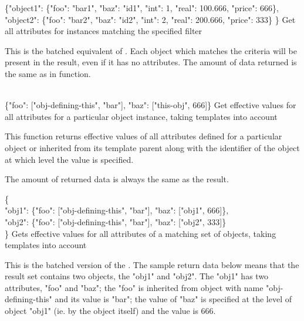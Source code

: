 \documentclass{article}
\begin{document}
    {\{"object1": \{"foo": "bar1", "baz": "id1", "int": 1, "real": 100.666, "price": 666\}, \\
       "object2": \{"foo": "bar2", "baz": "id2", "int": 2, "real": 200.666, "price": 333\}
      \}}
    {Get all attributes for instances matching the specified filter}
    {This is the batched equivalent of .  Each object which matches the criteria will
    be present in the result, even if it has no attributes.  The amount of data returned is the same as in
     function.

    \deskaUnsortedRes}

    {\\ \{"foo": ["obj-defining-this", "bar"], "baz": ["this-obj", 666]\}}
    {Get effective values for all attributes for a particular object instance, taking templates into account}
    {This function returns effective values of all attributes defined for a particular object or inherited from its
    template parent along with the identifier of the object at which level the value is specified.

    The amount of returned data is always the same as the  result.  \deskaUnsortedRes}

    { \{ \\
        "obj1": \{"foo": ["obj-defining-this", "bar"], "baz": ["obj1", 666]\}, \\ 
        "obj2": \{"foo": ["obj-defining-this", "bar"], "baz": ["obj2", 333]\} \\ 
      \} }
    {Gets effective values for all attributes of a matching set of objects, taking templates into account}
    {This is the batched version of the .  The sample return data below means that the
    result set contains two objects, the "obj1" and "obj2".  The "obj1" has two attributes, "foo" and "baz"; the "foo"
    is inherited from object with name "obj-defining-this" and its value is "bar"; the value of "baz" is specified at
    the level of object "obj1" (ie. by the object itself) and the value is 666.

    \deskaUnsortedRes}
\end{document}
